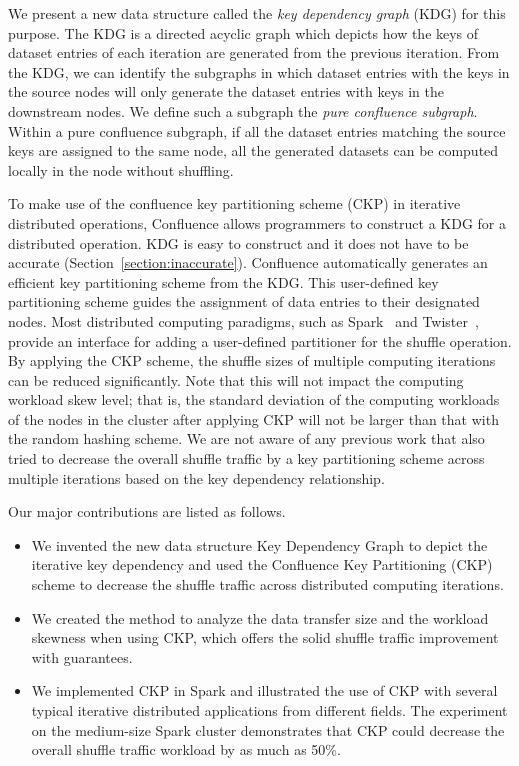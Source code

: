 \documentclass[10pt,journal,compsoc]{IEEEtran}
\begin{document}
We present a new data structure called the \emph{key dependency graph} (KDG) for this purpose.
The KDG is a directed acyclic graph which depicts how the keys of
dataset entries of each iteration are generated from the previous iteration.
From the KDG, we can identify the subgraphs in which dataset
entries with the keys in the source nodes will only generate the dataset
entries with keys in the downstream nodes. We define such a subgraph
the \emph{pure confluence subgraph}.
Within a pure confluence subgraph, if all the dataset entries matching
the source keys are assigned to the same node, all the generated
datasets can be computed locally in the node without shuffling.

To make use of the confluence key partitioning scheme (CKP) in iterative distributed operations, 
Confluence allows programmers to construct a KDG for a distributed operation. 
KDG is easy to construct and it does not have to be accurate (Section~\ref{section:inaccurate}). 
Confluence automatically generates an efficient key partitioning 
scheme from the KDG. 
This user-defined key partitioning scheme guides the assignment of data entries 
to their designated nodes. 
Most distributed computing paradigms, such as Spark~\cite{zaharia2012resilient} and Twister~\cite{ekanayake2010twister},
provide an interface for adding a user-defined partitioner for the shuffle
operation.
By applying the CKP scheme, the shuffle sizes of multiple computing
iterations can be reduced significantly. %
Note that this will not impact the computing workload skew level; that is,
the standard deviation of the computing workloads of the
nodes in the cluster after applying CKP will not be larger than that
with the random hashing scheme.
We are not aware of any previous work
that also tried to decrease the overall
shuffle traffic by a key partitioning scheme across multiple
iterations based on the
key dependency relationship.

Our major contributions are listed as follows.
\begin{itemize}
\setlength{\itemsep}{0pt}
\setlength{\parskip}{0pt}
\setlength{\parsep}{0pt}
\item We invented the new data structure Key Dependency Graph to depict the iterative key dependency
and used the Confluence Key Partitioning (CKP) scheme to decrease the shuffle traffic
across distributed computing iterations.

\item We created the method to analyze the data transfer size and the workload skewness when using CKP, which offers the solid shuffle traffic improvement with guarantees. 

\item We implemented CKP in Spark and illustrated the use of CKP with several typical iterative distributed applications from different fields. 
The experiment on the medium-size Spark cluster demonstrates that CKP could decrease the overall shuffle traffic workload by as much as 50\%.  
\end{itemize}
\end{document}
